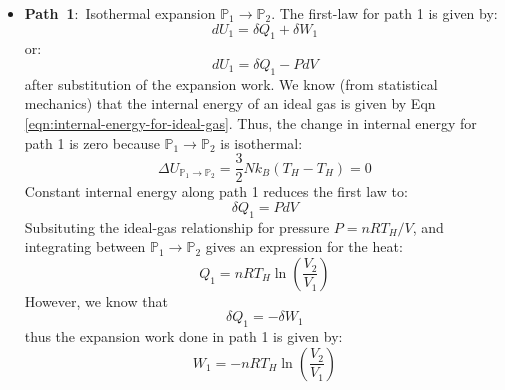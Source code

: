\documentclass[11pt]{article}
\theoremstyle{definition}
\begin{document}
\begin{itemize}
\item{\textbf{Path~1}:~Isothermal expansion $\mathbb{P}_{1}\rightarrow\mathbb{P}_{2}$.
The first-law for path 1 is given by:
\begin{equation}
	dU_{1} = \delta{Q}_{1}+\delta{W}_{1}
\end{equation}or:
\begin{equation}
	dU_{1} = \delta{Q}_{1} - PdV
\end{equation}after substitution of the expansion work. We know (from statistical mechanics) that the internal energy of an ideal gas is given by Eqn \eqref{eqn:internal-energy-for-ideal-gas}.
Thus, the change in internal energy for path 1 is zero because $\mathbb{P}_{1}\rightarrow\mathbb{P}_{2}$ is isothermal:
\begin{equation}
	\Delta{U}_{\mathbb{P}_{1}\rightarrow\mathbb{P}_{2}} = \frac{3}{2}Nk_{B}\left(T_{H}-T_{H}\right) = 0
\end{equation}Constant internal energy along path 1 reduces the first law to:
\begin{equation}
	\delta{Q}_{1} = PdV
\end{equation}Subsituting the ideal-gas relationship for pressure $P = nRT_{H}/{V}$, and integrating between $\mathbb{P}_{1}\rightarrow\mathbb{P}_{2}$ gives an expression for the heat:
\begin{equation}
	Q_{1} = nRT_{H}\ln\left(\frac{V_{2}}{V_{1}}\right)
\end{equation}However, we know that
\begin{equation}
	\delta{Q}_{1} = -\delta{W}_{1}
\end{equation} thus the expansion work done in path 1 is given by:
\begin{equation}
	W_{1} = - nRT_{H}\ln\left(\frac{V_{2}}{V_{1}}\right)
\end{equation}}


\end{itemize}
\end{document}
